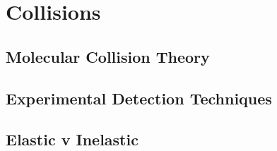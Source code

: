\chapter{Collisions}

\section{Molecular Collision Theory}

\section{Experimental Detection Techniques}

\section{Elastic v Inelastic}